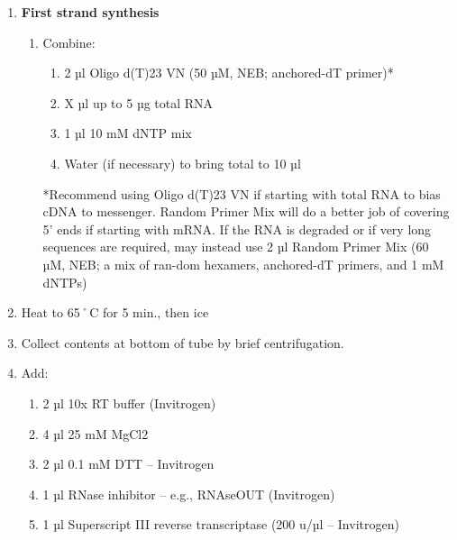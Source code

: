 \documentclass[
  letterpaper,
  DIV=11,
  numbers=noendperiod]{scrreprt}
\providecommand{\tightlist}{%
  \setlength{\itemsep}{0pt}\setlength{\parskip}{0pt}}\usepackage{longtable,booktabs,array}
\begin{document}
\begin{enumerate}
\def\labelenumi{\arabic{enumi}.}
\item
  \textbf{First strand synthesis}

  \begin{enumerate}
  \def\labelenumii{\arabic{enumii}.}
  \item
    Combine:

    \begin{enumerate}
    \def\labelenumiii{\arabic{enumiii}.}
    \tightlist
    \item
      2 µl Oligo d(T)23 VN (50 µM, NEB; anchored-dT primer)*
    \item
      X µl up to 5 µg total RNA
    \item
      1 µl 10 mM dNTP mix
    \item
      Water (if necessary) to bring total to 10 µl
    \end{enumerate}

    \begin{tcolorbox}[enhanced jigsaw, toprule=.15mm, breakable, coltitle=black, leftrule=.75mm, title=\textcolor{quarto-callout-important-color}{\faExclamation}\hspace{0.5em}{NOTE}, bottomrule=.15mm, toptitle=1mm, bottomtitle=1mm, colframe=quarto-callout-important-color-frame, opacityback=0, colback=white, opacitybacktitle=0.6, colbacktitle=quarto-callout-important-color!10!white, rightrule=.15mm, titlerule=0mm, arc=.35mm, left=2mm]

    *Recommend using Oligo d(T)23 VN if starting with total RNA to bias
    cDNA to messenger. Random Primer Mix will do a better job of
    covering 5' ends if starting with mRNA. If the RNA is degraded or if
    very long sequences are required, may instead use 2 µl Random Primer
    Mix (60 µM, NEB; a mix of ran-dom hexamers, anchored-dT primers, and
    1 mM dNTPs)

    \end{tcolorbox}
  \end{enumerate}
\item
  Heat to 65˚C for 5 min., then ice
\item
  Collect contents at bottom of tube by brief centrifugation.
\item
  Add:

  \begin{enumerate}
  \def\labelenumii{\arabic{enumii}.}
  \tightlist
  \item
    2 µl 10x RT buffer (Invitrogen)
  \item
    4 µl 25 mM MgCl2
  \item
    2 µl 0.1 mM DTT -- Invitrogen
  \item
    1 µl RNase inhibitor -- e.g., RNAseOUT (Invitrogen)
  \item
    1 µl Superscript III reverse transcriptase (200 u/µl -- Invitrogen)
  \end{enumerate}


\end{enumerate}
\end{document}
